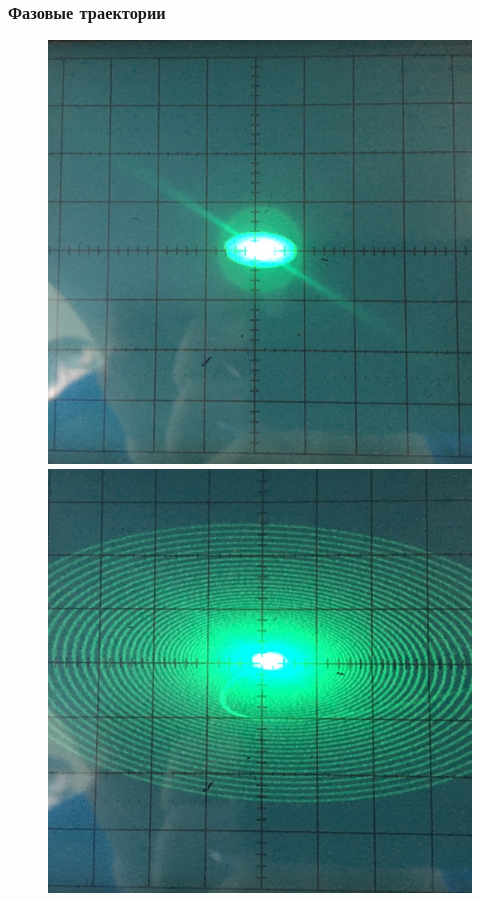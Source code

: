 \subsubsection{Фазовые траектории}
\begin{figure}[h!]
	\centering
	\begin{minipage}{0.32\linewidth}
	\includegraphics[width=\linewidth]{photo/task3b(lefts).jpg}
	\end{minipage}
	\begin{minipage}{0.32\linewidth}
	\includegraphics[width=\linewidth]{photo/task3b(leftm).jpg}

\end{minipage}
\end{figure}
